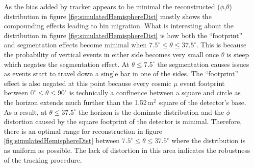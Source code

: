As the bias added by tracker appears to be minimal the reconstructed ($\phi$,$\theta$) distribution in figure \ref{fig:simulatedHemisphereDist} mostly shows the compounding effects leading to bin migration. What is interesting about the distribution in figure \ref{fig:simulatedHemisphereDist} is how both the ``footprint'' and segmentation effects become minimal when $7.5^\circ \leq \theta \leq 37.5^\circ$. This is because the probability of vertical events in either side becomes very small once $\theta$ is steep which negates the segmentation effect. At $\theta \leq 7.5^\circ$ the segmentation causes issues as events start to travel down a single bar in one of the sides. The ``footprint''  effect is also negated at this point because every cosmic $\mu$ event footprint between $0^\circ \leq \theta \leq 90^\circ$ is technically a confluence between a square and circle as the horizon extends much further than the 1.52\,m$^2$ square of the detector's base. As a result, at $\theta \leq 37.5^\circ$  the horizon is the dominate distribution and the $\phi$ distortion caused by the square footprint of the detector is minimal. Therefore, there is an optimal range for reconstruction in figure \ref{fig:simulatedHemisphereDist} between $7.5^\circ \leq \theta \leq 37.5^\circ$ where the distribution is as uniform as possible. The lack of distortion in this area indicates the robustness of the tracking procedure. 

